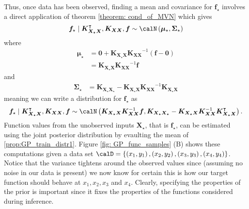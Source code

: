 Thus, once data has been observed, finding a mean and covariance for $\bm{f}_{\star}$ involves a direct application of theorem \ref{theorem: cond_of_MVN} which gives
\begin{align*}
    \bm{f}_{\star} \mid \bm{K_{X_{\star}X}}^{\intercal} , \bm{K_{XX}}, \bm{f} \sim \calN \left( \bm{\mu}_{\star}, \bm{\Sigma}_{\star} \right)
\end{align*}
where
\begin{align*}
    \bm{\mu}_{\star} & = \bm{0} + \bm{K_{X_{\star}X}} \bm{K_{XX}}^{-1} \left( \bm{f} - \bm{0} \right) \\
                     & = \bm{K_{X_{\star}X}} \bm{K_{XX}}^{-1} \bm{f}
\end{align*}
and
\begin{align*}
    \bm{\Sigma}_{\star} & = \bm{K_{X_{\star}X_{\star}}} - \bm{K_{X_{\star}X}} \bm{K_{XX}}^{-1} \bm{K_{X_{\star}X}}
\end{align*}
meaning we can write a distribution for $\bm{f}_{\star}$ as
\begin{equation}\label{prop:GP_train_distr1}
    \bm{f}_{\star} \mid \bm{K_{X_{\star}X}}^{\intercal} , \bm{K_{XX}}, \bm{f} \sim \calN \left( \bm{K_{X_{\star}X}} \bm{K_{XX}}^{-1} \bm{f},  \bm{K_{X_{\star}X_{\star}}} - \bm{K_{X_{\star}X}} \bm{K_{XX}}^{-1} \bm{K_{X_{\star}X}}^{\intercal}  \right).
\end{equation}
Function values from the unobserved inputs $\bm{X_{\star}}$, that is $\bm{f}_{\star}$, can be estimated using the joint posterior distribution by evaulting the mean of \ref{prop:GP_train_distr1}. Figure \ref{fig: GP_func_samples} (B) shows these computations given a data set $\calD = \left\{ \left( x_1 , y_1 \right) , \left( x_2 , y_2 \right) , \left( x_3 , y_3 \right) , \left( x_4 , y_4 \right) \right\}$. Notice that the variance tightens around the observed values since (assuming no noise in our data is present) we now know for certain this is how our target function should behave at $x_1,x_2,x_3$ and $x_4$. Clearly, specifying the properties of the prior is important since it fixes the properties of the functions considered during inference.

